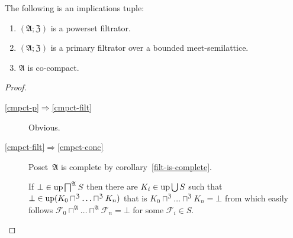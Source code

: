 \begin{thm}
The following is an implications tuple:
\begin{enumerate}
\item \label{cmpct-p}$(\mathfrak{A};\mathfrak{Z})$ is a powerset filtrator.
\item \label{cmpct-filt}$(\mathfrak{A};\mathfrak{Z})$ is a primary filtrator
over a bounded meet-semilattice.
\item \label{cmpct-conc}$\mathfrak{A}$ is co-compact.
\end{enumerate}
\end{thm}
\begin{proof}
~
\begin{description}
\item [{\ref{cmpct-p}$\Rightarrow$\ref{cmpct-filt}}] Obvious.
\item [{\ref{cmpct-filt}$\Rightarrow$\ref{cmpct-conc}}] Poset~$\mathfrak{A}$
is complete by corollary~\ref{filt-is-complete}.


If $\bot\in\operatorname{up}\bigsqcap^{\mathfrak{A}}S$ then there are $K_{i}\in\operatorname{up}\bigcup S$
such that $\bot\in\operatorname{up}(K_{0}\sqcap^{\mathfrak{Z}}\ldots\sqcap^{\mathfrak{Z}}K_{n})$
that is $K_{0}\sqcap^{\mathfrak{Z}}\ldots\sqcap^{\mathfrak{Z}}K_{n}=\bot$
from which easily follows $\mathcal{F}_{0}\sqcap^{\mathfrak{A}}\ldots\sqcap^{\mathfrak{A}}\mathcal{F}_{n}=\bot$
for some $\mathcal{F}_{i}\in S$.

\end{description}
\end{proof}

